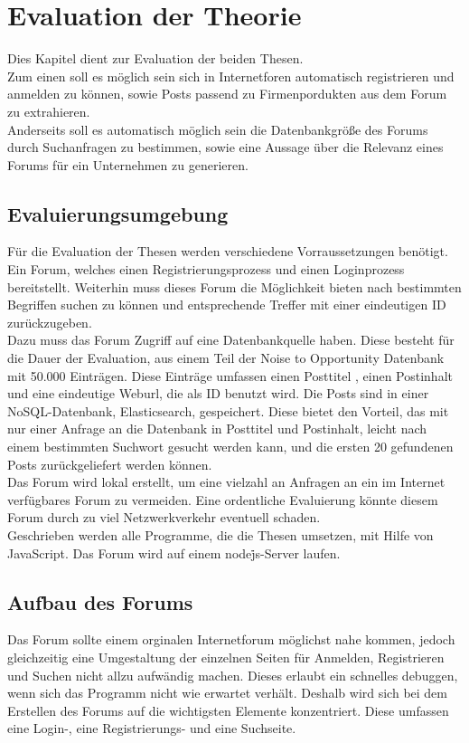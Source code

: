 \section{Evaluation der Theorie}
Dies Kapitel dient zur Evaluation der beiden Thesen.\\
Zum einen soll es möglich sein sich in Internetforen automatisch registrieren und anmelden zu können, sowie Posts passend zu Firmenpordukten aus dem Forum zu extrahieren.\\
Anderseits soll es automatisch möglich sein die Datenbankgröße des Forums durch Suchanfragen zu bestimmen, sowie eine Aussage über die Relevanz eines Forums für ein Unternehmen zu generieren.
\subsection{Evaluierungsumgebung}
Für die Evaluation der Thesen werden verschiedene Vorraussetzungen benötigt. Ein Forum, welches einen Registrierungsprozess und einen Loginprozess bereitstellt. Weiterhin muss dieses Forum die Möglichkeit bieten nach bestimmten Begriffen suchen zu können und entsprechende Treffer mit einer eindeutigen ID zurückzugeben.\\
Dazu muss das Forum Zugriff auf eine Datenbankquelle haben. Diese besteht für die Dauer der Evaluation, aus einem Teil der Noise to Opportunity Datenbank mit 50.000 Einträgen. Diese Einträge umfassen einen Posttitel , einen Postinhalt und eine eindeutige Weburl, die als ID benutzt wird. Die Posts sind in einer NoSQL-Datenbank, Elasticsearch, gespeichert. Diese bietet den Vorteil, das mit nur einer Anfrage an die Datenbank in Posttitel und Postinhalt, leicht nach einem bestimmten Suchwort gesucht werden kann, und die ersten 20 gefundenen Posts zurückgeliefert werden können.\\
Das Forum wird lokal erstellt, um eine vielzahl an Anfragen an ein im Internet verfügbares Forum zu vermeiden. Eine ordentliche Evaluierung könnte diesem Forum durch zu viel Netzwerkverkehr eventuell schaden.\\
Geschrieben werden alle Programme, die die Thesen umsetzen, mit Hilfe von JavaScript. Das Forum wird auf einem node\.js-Server laufen. 
\subsection{Aufbau des Forums}
Das Forum sollte einem orginalen Internetforum möglichst nahe kommen, jedoch gleichzeitig eine Umgestaltung der einzelnen Seiten für Anmelden, Registrieren und Suchen nicht allzu aufwändig machen. Dieses erlaubt ein schnelles debuggen, wenn sich das Programm nicht wie erwartet verhält. Deshalb wird sich bei dem Erstellen des Forums auf die wichtigsten Elemente konzentriert. Diese umfassen eine Login-, eine Registrierungs- und eine Suchseite.
